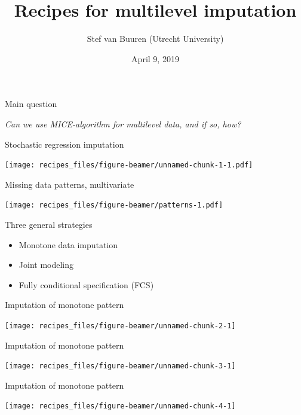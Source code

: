 \documentclass[ignorenonframetext,aspectratio=43]{beamer}
\title{Recipes for multilevel imputation}
\author{Stef van Buuren (Utrecht University)}
\date{April 9, 2019}
\providecommand{\tightlist}{%
  \setlength{\itemsep}{0pt}\setlength{\parskip}{0pt}}
\begin{document}
\frame{\titlepage}

\begin{frame}{Main question}

\emph{Can we use MICE-algorithm for multilevel data, and if so, how?}

\end{frame}

\begin{frame}{Stochastic regression imputation}

\texttt{[image: recipes\_files/figure-beamer/unnamed-chunk-1-1.pdf]}

\end{frame}

\begin{frame}{Missing data patterns, multivariate}

\texttt{[image: recipes\_files/figure-beamer/patterns-1.pdf]}

\end{frame}

\begin{frame}{Three general strategies}

\begin{itemize}
\tightlist
\item
  Monotone data imputation
\item
  Joint modeling
\item
  Fully conditional specification (FCS)
\end{itemize}

\end{frame}

\begin{frame}{Imputation of monotone pattern}

\begin{center}\texttt{[image: recipes\_files/figure-beamer/unnamed-chunk-2-1]} \end{center}

\end{frame}

\begin{frame}{Imputation of monotone pattern}

\begin{center}\texttt{[image: recipes\_files/figure-beamer/unnamed-chunk-3-1]} \end{center}

\end{frame}

\begin{frame}{Imputation of monotone pattern}

\begin{center}\texttt{[image: recipes\_files/figure-beamer/unnamed-chunk-4-1]} \end{center}

\end{frame}
\end{document}
